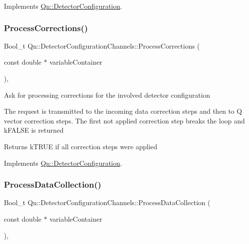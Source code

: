 Implements \mbox{\hyperlink{classQn_1_1DetectorConfiguration}{Qn\+::\+Detector\+Configuration}}.

\mbox{\label{classQn_1_1DetectorConfigurationChannels_a327a2d868d9cc1596e83f54354c3df44}} 
\subsubsection{\texorpdfstring{Process\+Corrections()}{ProcessCorrections()}}
{\footnotesize\ttfamily Bool\+\_\+t Qn\+::\+Detector\+Configuration\+Channels\+::\+Process\+Corrections (\begin{DoxyParamCaption}\item[{const double $\ast$}]{variable\+Container }\end{DoxyParamCaption})\hspace{0.3cm}{\ttfamily [inline]}, {\ttfamily [virtual]}}

Ask for processing corrections for the involved detector configuration

The request is transmitted to the incoming data correction steps and then to Q vector correction steps. The first not applied correction step breaks the loop and k\+F\+A\+L\+SE is returned \begin{DoxyReturn}{Returns}
k\+T\+R\+UE if all correction steps were applied 
\end{DoxyReturn}


Implements \mbox{\hyperlink{classQn_1_1DetectorConfiguration_aad0610bd5d168c29a32025ddf641e3fc}{Qn\+::\+Detector\+Configuration}}.

\mbox{\label{classQn_1_1DetectorConfigurationChannels_a972f2cc50810d2a9651f2920de5a03ec}} 
\subsubsection{\texorpdfstring{Process\+Data\+Collection()}{ProcessDataCollection()}}
{\footnotesize\ttfamily Bool\+\_\+t Qn\+::\+Detector\+Configuration\+Channels\+::\+Process\+Data\+Collection (\begin{DoxyParamCaption}\item[{const double $\ast$}]{variable\+Container }\end{DoxyParamCaption})\hspace{0.3cm}{\ttfamily [inline]}, {\ttfamily [virtual]}}

